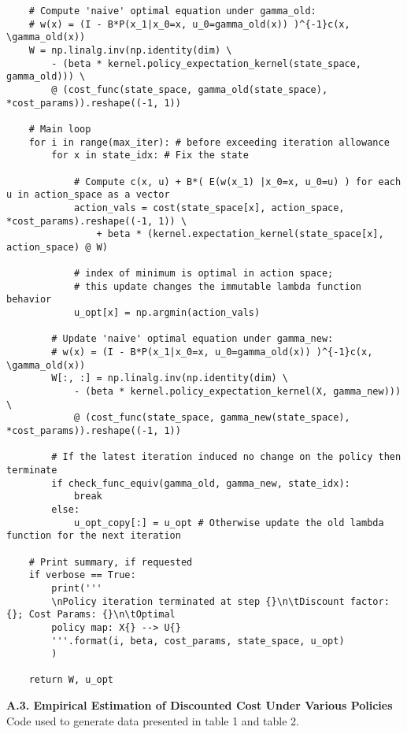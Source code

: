 \documentclass[10pt]{article}
\newcommand{\1}[1]{\mathbbm{1}_{#1}}
\begin{document}
\begin{verbatim}
    # Compute 'naive' optimal equation under gamma_old:
    # w(x) = (I - B*P(x_1|x_0=x, u_0=gamma_old(x)) )^{-1}c(x, \gamma_old(x))
    W = np.linalg.inv(np.identity(dim) \
        - (beta * kernel.policy_expectation_kernel(state_space, gamma_old))) \
        @ (cost_func(state_space, gamma_old(state_space), *cost_params)).reshape((-1, 1))

    # Main loop
    for i in range(max_iter): # before exceeding iteration allowance
        for x in state_idx: # Fix the state

            # Compute c(x, u) + B*( E(w(x_1) |x_0=x, u_0=u) ) for each u in action_space as a vector
            action_vals = cost(state_space[x], action_space, *cost_params).reshape((-1, 1)) \
                + beta * (kernel.expectation_kernel(state_space[x], action_space) @ W)

            # index of minimum is optimal in action space;
            # this update changes the immutable lambda function behavior
            u_opt[x] = np.argmin(action_vals) 

        # Update 'naive' optimal equation under gamma_new:
        # w(x) = (I - B*P(x_1|x_0=x, u_0=gamma_old(x)) )^{-1}c(x, \gamma_old(x))
        W[:, :] = np.linalg.inv(np.identity(dim) \
            - (beta * kernel.policy_expectation_kernel(X, gamma_new))) \
            @ (cost_func(state_space, gamma_new(state_space), *cost_params)).reshape((-1, 1)) 
        
        # If the latest iteration induced no change on the policy then terminate
        if check_func_equiv(gamma_old, gamma_new, state_idx):
            break
        else:
            u_opt_copy[:] = u_opt # Otherwise update the old lambda function for the next iteration

    # Print summary, if requested
    if verbose == True:
        print('''
        \nPolicy iteration terminated at step {}\n\tDiscount factor: {}; Cost Params: {}\n\tOptimal
        policy map: X{} --> U{}
        '''.format(i, beta, cost_params, state_space, u_opt)
        )
    
    return W, u_opt
    \end{verbatim}
    {\bf A.3. Empirical Estimation of Discounted Cost Under Various Policies}\\[5pt]
    Code used to generate data presented in table 1 and table 2.
\end{document}
